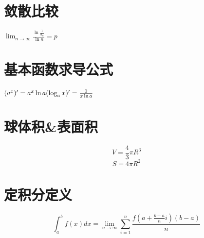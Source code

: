 \documentclass[UTF8]{ctexart}
\begin{document}
\section{敛散比较}
$\lim_{n \rightarrow \infty} \frac{\ln\frac{1}{u_n}}{\ln n }=p$
\section{基本函数求导公式}
$ (a^x)'=a^x \ln a \\
  ( \log _a x)'=\frac{1}{x \ln a} $

\section{球体积\&表面积}
$$ V=\frac{4}{3} \pi R^3$$
$$ S= 4 \pi R^2$$

\section{定积分定义}
$$ \int_a^b f(x)dx= \lim_{n \rightarrow \infty } \sum_{i=1}^n \frac{f \left( a+ \frac{b-a}{n}i \right)(b-a)}{n}$$
\end{document}
